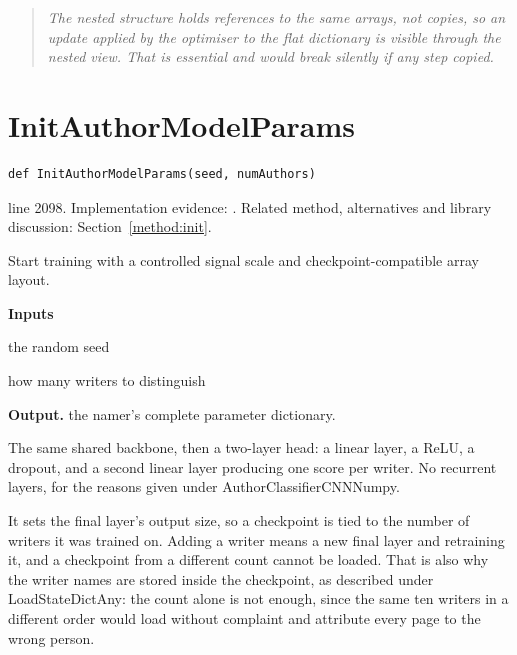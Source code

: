 \begin{quote}\small\itshape The nested structure holds references to the same arrays, not copies, so an update applied by the optimiser to the flat dictionary is visible through the nested view. That is essential and would break silently if any step copied.\end{quote}


\section{InitAuthorModelParams}\label{fn:train:InitAuthorModelParams}
\begin{lstlisting}[style=sig]
def InitAuthorModelParams(seed, numAuthors)
\end{lstlisting}
 line 2098. Implementation evidence: \cite{code2026}. Related method, alternatives and library discussion: Section~\ref{method:init}.


Start training with a controlled signal scale and checkpoint-compatible array layout.




\noindent\textbf{Inputs}
\begin{description}[leftmargin=2.2em,style=nextline,font=\normalfont\ttfamily]\setlength\itemsep{1pt}
  \item[{seed}] \normalfont the random seed
  \item[{numAuthors}] \normalfont how many writers to distinguish
\end{description}

\noindent\textbf{Output.} the namer's complete parameter dictionary.


The same shared backbone, then a two-layer head: a linear layer, a ReLU, a dropout, and a second linear layer producing one score per writer. No recurrent layers, for the reasons given under AuthorClassifierCNNNumpy.


It sets the final layer's output size, so a checkpoint is tied to the number of writers it was trained on. Adding a writer means a new final layer and retraining it, and a checkpoint from a different count cannot be loaded. That is also why the writer names are stored inside the checkpoint, as described under LoadStateDictAny: the count alone is not enough, since the same ten writers in a different order would load without complaint and attribute every page to the wrong person.



